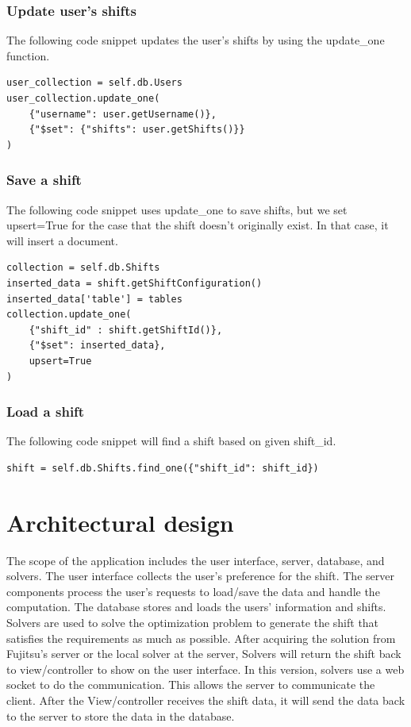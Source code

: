 \documentclass[11pt, oneside]{article}   	%
\begin{document}
\subsubsection{Update user's shifts}
The following code snippet updates the user's shifts by using the update\_one function.
\begin{verbatim}
user_collection = self.db.Users
user_collection.update_one(
	{"username": user.getUsername()}, 
	{"$set": {"shifts": user.getShifts()}}
)
\end{verbatim}

\subsubsection{Save a shift}
The following code snippet uses update\_one to save shifts, but we set upsert=True for the case that the shift doesn't originally exist. In that case, it will insert a document.
\begin{verbatim}
collection = self.db.Shifts
inserted_data = shift.getShiftConfiguration() 
inserted_data['table'] = tables
collection.update_one(
	{"shift_id" : shift.getShiftId()}, 
	{"$set": inserted_data}, 
	upsert=True
)
\end{verbatim}

\subsubsection{Load a shift}
The following code snippet will find a shift based on given shift\_id.
\begin{verbatim}
shift = self.db.Shifts.find_one({"shift_id": shift_id})
\end{verbatim}

\section{Architectural design}
The scope of the application includes the user interface, server, database, and solvers. The user interface collects the user's preference for the shift. The server components process the user's requests to load/save the data and handle the computation. The database stores and loads the users' information and shifts. Solvers are used to solve the optimization problem to generate the shift that satisfies the requirements as much as possible. After acquiring the solution from Fujitsu's server or the local solver at the server, Solvers will return the shift back to view/controller to show on the user interface. In this version, solvers use a web socket to do the communication. This allows the server to communicate the client. After the View/controller receives the shift data, it will send the data back to the server to store the data in the database. 
\end{document}
